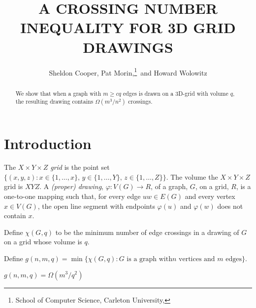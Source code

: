 \documentclass{patmorin}
\title{\MakeUppercase{A Crossing Number Inequality for 3D Grid Drawings}}
\author{Sheldon Cooper, Pat Morin,\thanks{School of Computer Science, Carleton University, \email{morin@scs.carleton.ca}}\ and Howard Wolowitz}
\begin{document}
\maketitle

\begin{abstract}
   We show that when a graph with $m\ge cq$ edges is drawn on a 3D-grid
   with volume $q$, the resulting drawing contains $\Omega(m^3/n^2)$
   crossings.
\end{abstract}

\section{Introduction}

The \emph{$X\times Y\times Z$ grid} is the point set $\{(x,y,z):
x\in\{1,\ldots,x\},\, y\in\{1,\ldots,Y\},\, z\in\{1,\ldots,Z\}\}$.
The volume the $X\times Y\times Z$ grid is $XYZ$. A \emph{(proper)
drawing}, $\varphi:V(G)\rightarrow R$, of a graph, $G$, on a grid,
$R$, is a one-to-one mapping such that, for every edge $uw\in E(G)$ and
every vertex $x\in V(G)$, the open line segment with endpoints $\varphi(u)$ and $\varphi(w)$
does not contain $x$.

Define $\chi(G,q)$ to be the minimum number of edge crossings in a drawing of $G$ on a grid whose volume is $q$.

Define $g(n,m,q)=\min\{\chi(G,q):\text{$G$ is a graph with
$n$ vertices and $m$ edges}\}$.

\begin{thm}
  $g(n,m,q)=\Omega(m^3/q^2)$ 
\end{thm}
\end{document}
